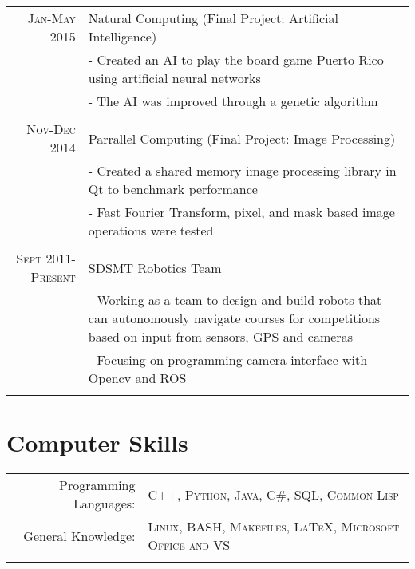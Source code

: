 \documentclass[10pt,a4paper]{article} %
\begin{document}
\begin{tabular}{r|p{11cm}}
\textsc{Jan-May 2015} & Natural Computing (Final Project: Artificial Intelligence) \emph{}\\
& \footnotesize{- Created an AI to play the board game Puerto Rico using artificial neural networks }\\
& \footnotesize{- The AI was improved through a genetic algorithm} \\
\multicolumn{2}{c}{} \\

\textsc{Nov-Dec 2014} & Parrallel Computing (Final Project: Image Processing) \emph{}\\
& \footnotesize{- Created a shared memory image processing library in Qt to benchmark performance} \\
& \footnotesize{- Fast Fourier Transform, pixel, and mask based image operations were tested} \\
\multicolumn{2}{c}{} \\

\textsc{Sept 2011-Present} & SDSMT Robotics Team \emph{}\\
& \footnotesize{- Working as a team to design and build robots that can autonomously navigate courses for competitions based on input from sensors, GPS and cameras}\\
& \footnotesize{- Focusing on programming camera interface with Opencv and ROS} \\
\multicolumn{2}{c}{} \\
\end{tabular}



\section{Computer Skills}

\begin{tabular}{rl}
Programming Languages: & \textsc{C++}, \textsc{Python}, \textsc{Java}, \textsc{C\#}, \textsc{SQL}, \textsc{Common Lisp} \\
General Knowledge: & \textsc{Linux}, \textsc{BASH}, \textsc{Makefiles}, \textsc{LaTeX},  \textsc{Microsoft Office and VS} \\
\setmainfont[SmallCapsFont=Fontin SmallCaps]{Fontin-Regular}\\
\end{tabular}
\end{document}
